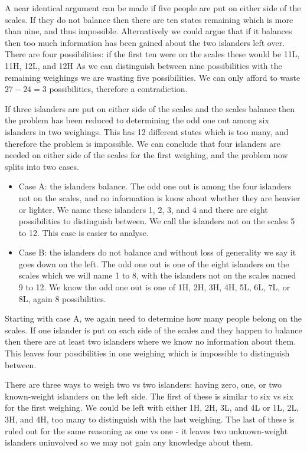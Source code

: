 A near identical argument can be made if five people are put on either side of the scales. If they do not balance then there are ten states remaining which is more than nine, and thus impossible. Alternatively we could argue that if it balances then too much information has been gained about the two islanders left over. There are four possibilities: if the first ten were on the scales these would be 11L, 11H, 12L, and 12H  As we can distinguish between nine possibilities with the remaining weighings we are wasting five possibilities. We can only afford to waste $27 - 24 = 3$ possibilities, therefore a contradiction.

If three islanders are put on either side of the scales and the scales balance then the problem has been reduced to determining the odd one out among six islanders in two weighings. This has 12 different states which is too many, and therefore the problem is impossible. We can conclude that four islanders are needed on either side of the scales for the first weighing, and the problem now splits into two cases.

\begin{itemize}
	\item Case A: the islanders balance. The odd one out is among the four islanders not on the scales, and no information is know about whether they are heavier or lighter. We name these islanders 1, 2, 3, and 4 and there are eight possibilities to distinguish between. We call the islanders not on the scales 5 to 12. This case is easier to analyse.
	\item Case B: the islanders do not balance and without loss of generality we say it goes down on the left. The odd one out is one of the eight islanders on the scales which we will name 1 to 8, with the islanders not on the scales named 9 to 12. We know the odd one out is one of 1H, 2H, 3H, 4H, 5L, 6L, 7L, or 8L, again 8 possibilities.
\end{itemize}

Starting with case A, we again need to determine how many people belong on the scales. If one islander is put on each side of the scales and they happen to balance then there are at least two islanders where we know no information about them. This leaves four possibilities in one weighing which is impossible to distinguish between.

There are three ways to weigh two vs two islanders: having zero, one, or two known-weight islanders on the left side. The first of these is similar to six vs six for the first weighing. We could be left with either 1H, 2H, 3L, and 4L or 1L, 2L, 3H, and 4H, too many to distinguish with the last weighing. The last of these is ruled out for the same reasoning as one vs one - it leaves two unknown-weight islanders uninvolved so we may not gain any knowledge about them.


